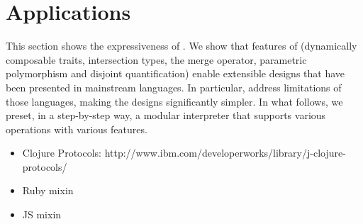 \section{Applications}



This section shows the expressiveness of \name. We show that features of \name
(dynamically composable traits, intersection types, the merge operator,
parametric polymorphism and disjoint quantification) enable extensible designs
that have been presented in mainstream languages. In particular, \name address
limitations of those languages, making the designs significantly simpler. In
what follows, we preset, in a step-by-step way, a modular interpreter that
supports various operations with various features.



\begin{itemize}
\item Clojure Protocols: http://www.ibm.com/developerworks/library/j-clojure-protocols/
\item Ruby mixin
\item JS mixin
\end{itemize}
